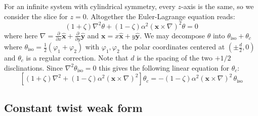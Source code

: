 \documentclass[reqno]{article}
\begin{document}
For an infinite system with cylindrical symmetry, every $z$-axis is the same, so we consider the slice for $z = 0$.
Altogether the Euler-Lagrange equation reads:
\begin{equation}
    \left(1 + \zeta \right) \nabla^2 \theta
    +
    \left(1 - \zeta \right) \alpha^2 \left(
        \mathbf{x} \times \nabla
    \right)^2 \theta
    =
    0
\end{equation}
where here $\nabla = \frac{\partial}{\partial x} \hat{\mathbf{x}} + \frac{\partial}{\partial y} \hat{\mathbf{y}}$ and $\mathbf{x} = x \hat{\mathbf{x}} + y \hat{\mathbf{y}}$.
We may decompose $\theta$ into $\theta_\text{iso} + \theta_c$ where $\theta_\text{iso} = \frac12 \left(\varphi_1 + \varphi_2\right)$ with $\varphi_1, \varphi_2$ the polar coordinates centered at $\left(\pm \frac{d}{2}, 0\right)$ and $\theta_c$ is a regular correction.
Note that $d$ is the spacing of the two $+1/2$ disclinations. 
Since $\nabla^2 \theta_\text{iso} = 0$ this gives the following linear equation for $\theta_c$:
\begin{equation}
    \left[
        (1 + \zeta) \nabla^2 
        + (1 - \zeta) \alpha^2 \left(\mathbf{x} \times \nabla\right)^2
    \right] \theta_c
    =
    -(1 - \zeta) \alpha^2 \left(\mathbf{x} \times \nabla \right)^2 \, \theta_\text{iso}
\end{equation}

\subsection{Constant twist weak form}
\end{document}
